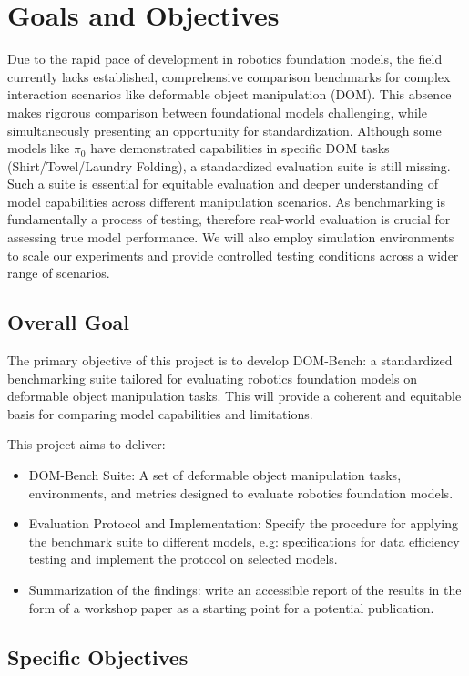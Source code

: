 \section{Goals and Objectives}
Due to the rapid pace of development in robotics foundation models, the field currently lacks established, comprehensive comparison benchmarks for complex interaction scenarios like deformable object manipulation (DOM).
This absence makes rigorous comparison between foundational models challenging, while simultaneously presenting an opportunity for standardization.
Although some models like $\pi_0$ \cite{pi_zero} have demonstrated capabilities in specific DOM tasks (Shirt/Towel/Laundry Folding), a standardized evaluation suite is still missing.
Such a suite is essential for equitable evaluation and deeper understanding of model capabilities across different manipulation scenarios.
As benchmarking is fundamentally a process of testing, therefore real-world evaluation is crucial for assessing true model performance. We will also employ simulation environments to scale our experiments and provide controlled testing conditions across a wider range of scenarios.

\subsection{Overall Goal}
The primary objective of this project is to develop DOM-Bench: a standardized benchmarking suite tailored for evaluating robotics foundation models on deformable object manipulation tasks. This will provide a coherent and equitable basis for comparing model capabilities and limitations.

This project aims to deliver:
\begin{itemize}
    \item DOM-Bench Suite: A set of deformable object manipulation tasks, environments, and metrics designed to evaluate robotics foundation models.
    \item Evaluation Protocol and Implementation: Specify the procedure for applying the benchmark suite to different models, e.g: specifications for data efficiency testing and implement the protocol on selected models.
    \item Summarization of the findings: write an accessible report of the results in the form of a workshop paper as a starting point for a potential publication.
\end{itemize}


\subsection{Specific Objectives}

